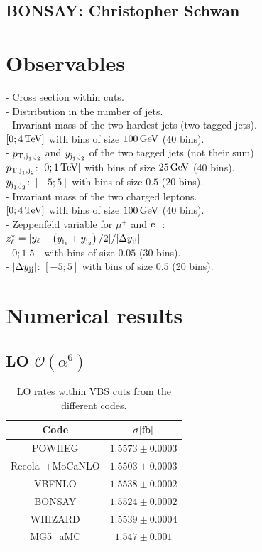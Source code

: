 \documentclass[a4paper,10pt]{report}
\begin{document}
\subsection{{\sc BONSAY}: Christopher Schwan}

\section{Observables}
- Cross section within cuts. \\
- Distribution in the number of jets. \\
- Invariant mass of the two hardest jets (two tagged jets). \\
$[0; 4\,\text{TeV}]$ with bins of size $100\,\text{GeV}$ (40 bins). \\
- $p_{\text{T},\text{j}_1,\text{j}_2}$ and $y_{\text{j}_1,\text{j}_2}$ of the two tagged jets (not their sum) \\
$p_{\text{T},\text{j}_1,\text{j}_2}$: $[0; 1\,\text{TeV}]$ with bins of size $25\,\text{GeV}$ (40 bins). \\
$y_{\text{j}_1,\text{j}_2}$: $[-5;5]$ with bins of size $0.5$ (20 bins). \\
- Invariant mass of the two charged leptons. \\
$[0; 4\,\text{TeV}]$ with bins of size $100\,\text{GeV}$ (40 bins). \\
- Zeppenfeld variable for $\mu^+$ and $\text{e}^+$: \\
$z^*_\ell = |y_\ell - \left(y_{\text{j}_1}+y_{\text{j}_2} \right)/2|/|\Delta y_{\text{j}\text{j}}|$ \\
$[0;1.5]$ with bins of size $0.05$ (30 bins). \\
- $|\Delta y_{\text{j} \text{j}}|$: $[-5;5]$ with bins of size $0.5$ (20 bins).


\section{Numerical results}

\subsection{LO $\mathcal{O}\left(\alpha^6\right)$}

\begin{table}[h!]
    \begin{tabular}{c|c}
        Code  &  $\sigma[\rm{fb}]$  \\
        \hline
        \hline
        {\sc POWHEG}  &  $1.5573 \pm 0.0003$ \\
        {\sc Recola\ +{\sc MoCaNLO}}  &  $1.5503 \pm 0.0003$ \\
        {\sc VBFNLO}  &  $1.5538 \pm 0.0002$ \\
        {\sc BONSAY}  &  $1.5524 \pm 0.0002$ \\
        {\sc WHIZARD} &  $1.5539 \pm 0.0004$ \\
        {\sc MG5\_aMC}&  $1.547 \pm 0.001$   
    \end{tabular}
    \caption{\label{tab:LOrates} LO rates within VBS cuts from the different codes.}
\end{table}
\end{document}
